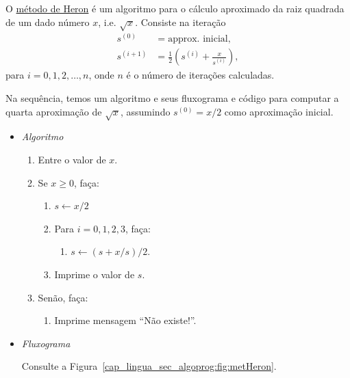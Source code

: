 \begin{ex}\label{cap_lingua_sec_algoprog:ex:metHeron}
  O \href{https://en.wikipedia.org/wiki/Methods_of_computing_square_roots#Heron's_method}{método de Heron}{\heron} é um algoritmo para o cálculo aproximado da raiz quadrada de um dado número $x$, i.e. $\sqrt{x}$. Consiste na iteração
  \begin{align}
    s^{(0)} &= \text{approx. inicial},\\
    s^{(i+1)} &= \frac{1}{2}\left(s^{(i)} + \frac{x}{s^{(i)}}\right),
  \end{align}
  para $i=0,1,2,\ldots,n$, onde $n$ é o número de iterações calculadas.

  Na sequência, temos um algoritmo e seus fluxograma e código {\python} para computar a quarta aproximação de $\sqrt{x}$, assumindo $s^{(0)} = x/2$ como aproximação inicial.

  \begin{itemize}
  \item \emph{Algoritmo}
    \begin{enumerate}
    \item Entre o valor de $x$.
    \item Se $x\geq 0$, faça:
      \begin{enumerate}
      \item $s \leftarrow x/2$
      \item Para $i = 0,1,2,3$, faça:
        \begin{enumerate}
        \item $s \leftarrow (s + x/s)/2$.
        \end{enumerate}
      \item Imprime o valor de $s$.
      \end{enumerate}
    \item Senão, faça:
      \begin{enumerate}
      \item Imprime mensagem ``Não existe!''.
      \end{enumerate}
    \end{enumerate}

  \item \emph{Fluxograma}
  
    Consulte a Figura~\ref{cap_lingua_sec_algoprog:fig:metHeron}.
    

\end{itemize}
\end{ex}

